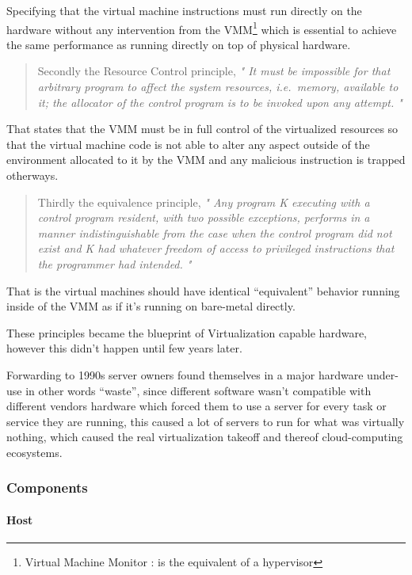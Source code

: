 \documentclass[
  14pt,
  english,
  a4paper,
]{scrreprt}
\begin{document}
Specifying that the virtual machine instructions must run directly on
the hardware without any intervention from the VMM\footnote{Virtual
  Machine Monitor : is the equivalent of a hypervisor} which is
essential to achieve the same performance as running directly on top of
physical hardware.

\begin{quote}
Secondly the Resource Control principle, \emph{" It must be impossible
for that arbitrary program to affect the system resources, i.e.~memory,
available to it; the allocator of the control program is to be invoked
upon any attempt. "}
\end{quote}

That states that the VMM must be in full control of the virtualized
resources so that the virtual machine code is not able to alter any
aspect outside of the environment allocated to it by the VMM and any
malicious instruction is trapped otherways.

\begin{quote}
Thirdly the equivalence principle, \emph{" Any program K executing with
a control program resident, with two possible exceptions, performs in a
manner indistinguishable from the case when the control program did not
exist and K had whatever freedom of access to privileged instructions
that the programmer had intended. "}
\end{quote}

That is the virtual machines should have identical ``equivalent''
behavior running inside of the VMM as if it's running on bare-metal
directly.

These principles became the blueprint of Virtualization capable
hardware, however this didn't happen until few years later.

Forwarding to 1990s server owners found themselves in a major hardware
under-use in other words ``waste'', since different software wasn't
compatible with different vendors hardware which forced them to use a
server for every task or service they are running, this caused a lot of
servers to run for what was virtually nothing, which caused the real
virtualization takeoff and thereof cloud-computing ecosystems.

\hypertarget{components}{%
\subsubsection{Components}\label{components}}

\hypertarget{host}{%
\paragraph{Host}\label{host}}
\end{document}
